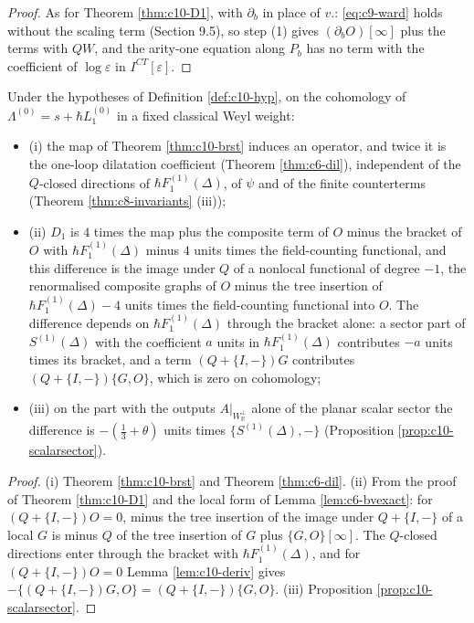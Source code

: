 \begin{proof}
As for Theorem \ref{thm:c10-D1}, with $\partial_b$ in place of $v.$: \eqref{eq:c9-ward} holds without the scaling term (Section 9.5), so step (1) gives $(\partial_bO)[\infty]$ plus the terms with $QW$, and the arity-one equation along $P_b$ has no term with the coefficient of $\log\varepsilon$ in $I^{CT}[\varepsilon]$.
\end{proof}

\begin{proposition}[Spectrum]
\label{prop:c10-spec}
Under the hypotheses of Definition \ref{def:c10-hyp}, on the cohomology of $\Lambda^{(0)}=s+\hbar L_1^{(0)}$ in a fixed classical Weyl weight:
\begin{itemize}
\item (i) the map of Theorem \ref{thm:c10-brst} induces an operator, and twice it is the one-loop dilatation coefficient (Theorem \ref{thm:c6-dil}), independent of the $Q$-closed directions of $\hbar F_1^{(1)}(\Delta)$, of $\psi$ and of the finite counterterms (Theorem \ref{thm:c8-invariants} (iii));
\item (ii) $D_1$ is $4$ times the map plus the composite term of $O$ minus the bracket of $O$ with $\hbar F_1^{(1)}(\Delta)$ minus $4$ units times the field-counting functional, and this difference is the image under $Q$ of a nonlocal functional of degree $-1$, the renormalised composite graphs of $O$ minus the tree insertion of $\hbar F_1^{(1)}(\Delta)-4$ units times the field-counting functional into $O$. The difference depends on $\hbar F_1^{(1)}(\Delta)$ through the bracket alone: a sector part of $S^{(1)}(\Delta)$ with the coefficient $a$ units in $\hbar F_1^{(1)}(\Delta)$ contributes $-a$ units times its bracket, and a term $(Q+\{I,-\})G$ contributes $(Q+\{I,-\})\{G,O\}$, which is zero on cohomology;
\item (iii) on the part with the outputs $A|_{W_{\mathbb R}^\perp}$ alone of the planar scalar sector the difference is $-(\tfrac13+\theta)$ units times $\{S^{(1)}(\Delta),-\}$ (Proposition \ref{prop:c10-scalarsector}).
\end{itemize}
\end{proposition}

\begin{proof}
(i) Theorem \ref{thm:c10-brst} and Theorem \ref{thm:c6-dil}. (ii) From the proof of Theorem \ref{thm:c10-D1} and the local form of Lemma \ref{lem:c6-bvexact}: for $(Q+\{I,-\})O=0$, minus the tree insertion of the image under $Q+\{I,-\}$ of a local $G$ is minus $Q$ of the tree insertion of $G$ plus $\{G,O\}[\infty]$. The $Q$-closed directions enter through the bracket with $\hbar F_1^{(1)}(\Delta)$, and for $(Q+\{I,-\})O=0$ Lemma \ref{lem:c10-deriv} gives $-\{(Q+\{I,-\})G,O\}=(Q+\{I,-\})\{G,O\}$. (iii) Proposition \ref{prop:c10-scalarsector}.
\end{proof}


